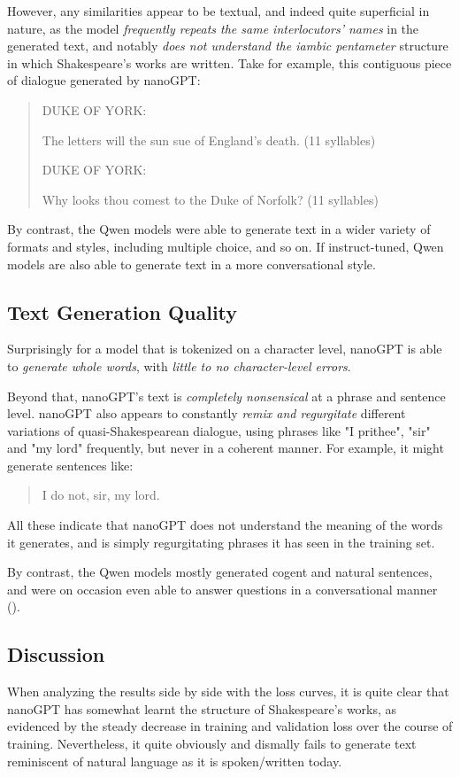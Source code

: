 \documentclass{article} %
\theoremstyle{definition}
\begin{document}
However, any similarities appear to be textual, and indeed quite superficial in nature,
as the model \textit{frequently repeats the same interlocutors' names} in the generated text,
and notably \textit{does not understand the iambic pentameter} structure in which Shakespeare's 
works are written. Take for example, this contiguous piece of dialogue generated by nanoGPT:
\begin{quote}
DUKE OF YORK:

The letters will the sun sue of England's death. (11 syllables)

DUKE OF YORK:

Why looks thou comest to the Duke of Norfolk? (11 syllables)
\end{quote}


By contrast, the Qwen models were able to generate text in a wider variety of formats
and styles, including multiple choice, and so on. If instruct-tuned, Qwen models
are also able to generate text in a more conversational style.

\subsection{Text Generation Quality}
Surprisingly for a model that is tokenized on a character level,
nanoGPT is able to \textit{generate whole words}, with \textit{little to no character-level errors}.

Beyond that, nanoGPT's text is \textit{completely nonsensical} at a phrase and sentence level.
nanoGPT also appears to constantly \textit{remix and regurgitate} different variations
of quasi-Shakespearean dialogue, using phrases like "I prithee", "sir" and "my lord" frequently,
but never in a coherent manner. For example, it might generate sentences like:
\begin{quote}
    I do not, sir, my lord. 
\end{quote}

All these indicate that nanoGPT does not understand the meaning of the words it generates,
and is simply regurgitating phrases it has seen in the training set.

By contrast, the Qwen models mostly generated cogent and natural sentences,
and were on occasion even able to answer questions in a conversational manner (\cite{beh-2025-b}).

\subsection{Discussion}
When analyzing the results side by side with the loss curves,
it is quite clear that nanoGPT has somewhat learnt the structure of Shakespeare's works,
as evidenced by the steady decrease in training and validation loss
over the course of training. Nevertheless, it quite obviously and dismally fails 
to generate text reminiscent of natural language as it is spoken/written today.
\end{document}
